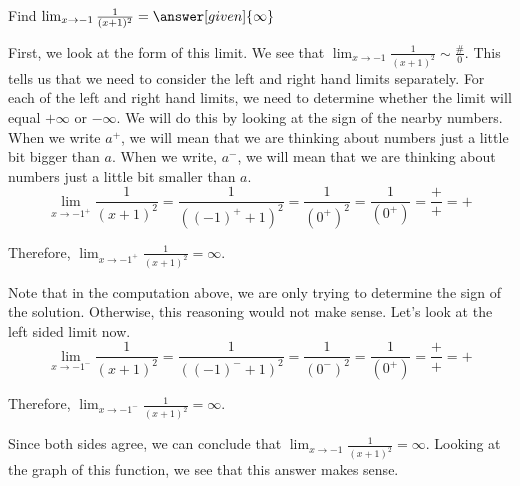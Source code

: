\documentclass{ximera}
\begin{document}
\begin{example}
Find $\lim_{x\to -1} \frac{1}{(x+1)^2} = \answer[given]{\infty}$
\begin{explanation}
First, we look at the form of this limit.  We see that $\lim_{x\to -1} \frac{1}{(x+1)^2} \sim \frac{\#}{0}$.  This tells us that we need to consider the left and right hand limits separately.  For each of the left and right hand limits, we need to determine whether the limit will equal $+\infty$ or $-\infty$.  We will do this by looking at the sign of the nearby numbers.  When we write $a^+$, we will mean that we are thinking about numbers just a little bit bigger than $a$.  When we write, $a^-$, we will mean that we are thinking about numbers just a little bit smaller than $a$.\\
\begin{equation}
\lim_{x\to -1^+} \frac{1}{(x+1)^2} = \frac{1}{((-1)^+ +1)^2}
 = \frac{1}{(0^+)^2}
 = \frac{1}{(0^+)}
 =\frac{+}{+} = +
\end{equation}

Therefore, $\lim_{x\to -1^+} \frac{1}{(x+1)^2} = \infty$.

Note that in the computation above, we are only trying to determine the sign of the solution.  Otherwise, this reasoning would not make sense.  Let's look at the left sided limit now.
\begin{equation}
\lim_{x\to -1^-} \frac{1}{(x+1)^2} = \frac{1}{((-1)^- +1)^2}
 = \frac{1}{(0^-)^2}
 = \frac{1}{(0^+)}
 =\frac{+}{+} = +
\end{equation}

Therefore, $\lim_{x\to -1^-} \frac{1}{(x+1)^2} = \infty$.

Since both sides agree, we can conclude that $\lim_{x\to -1} \frac{1}{(x+1)^2} = \infty$.  Looking at the graph of this function, we see that this answer makes sense.\\

\end{explanation}
\end{example}
\end{document}
